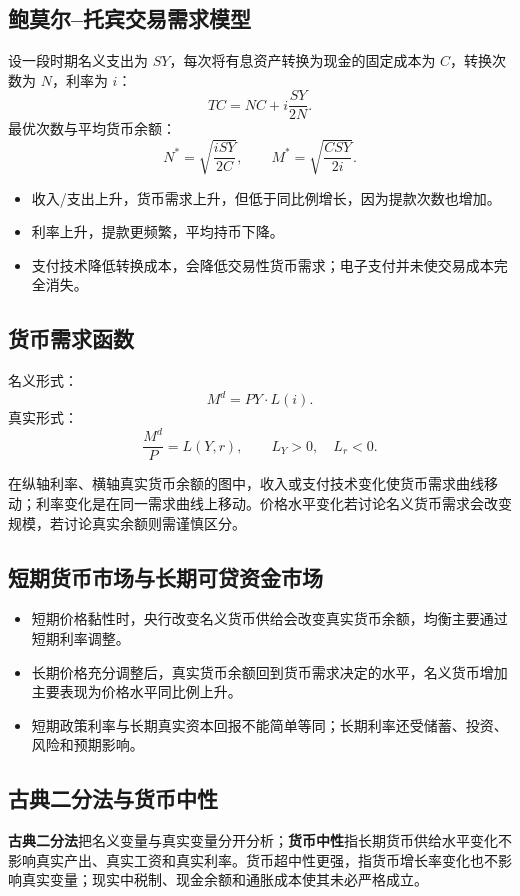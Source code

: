 \documentclass[UTF8,11pt,a4paper]{ctexart}
\newcommand{\term}[1]{\textbf{#1}}
\begin{document}
\subsection{鲍莫尔--托宾交易需求模型}
设一段时期名义支出为 $SY$，每次将有息资产转换为现金的固定成本为 $C$，转换次数为 $N$，利率为 $i$：
\[
TC=NC+i\frac{SY}{2N}.
\]
最优次数与平均货币余额：
\[
N^*=\sqrt{\frac{iSY}{2C}},
\qquad
M^*=\sqrt{\frac{CSY}{2i}}.
\]
\begin{itemize}
  \item 收入/支出上升，货币需求上升，但低于同比例增长，因为提款次数也增加。
  \item 利率上升，提款更频繁，平均持币下降。
  \item 支付技术降低转换成本，会降低交易性货币需求；电子支付并未使交易成本完全消失。
\end{itemize}

\subsection{货币需求函数}
名义形式：
\[
M^d=PY\cdot L(i).
\]
真实形式：
\[
\frac{M^d}{P}=L(Y,r),
\qquad L_Y>0,\quad L_r<0.
\]
\begin{warningbox}[曲线移动与沿曲线移动]
在纵轴利率、横轴真实货币余额的图中，收入或支付技术变化使货币需求曲线移动；利率变化是在同一需求曲线上移动。价格水平变化若讨论名义货币需求会改变规模，若讨论真实余额则需谨慎区分。
\end{warningbox}

\subsection{短期货币市场与长期可贷资金市场}
\begin{itemize}
  \item 短期价格黏性时，央行改变名义货币供给会改变真实货币余额，均衡主要通过短期利率调整。
  \item 长期价格充分调整后，真实货币余额回到货币需求决定的水平，名义货币增加主要表现为价格水平同比例上升。
  \item 短期政策利率与长期真实资本回报不能简单等同；长期利率还受储蓄、投资、风险和预期影响。
\end{itemize}

\subsection{古典二分法与货币中性}
\term{古典二分法}把名义变量与真实变量分开分析；\term{货币中性}指长期货币供给水平变化不影响真实产出、真实工资和真实利率。货币超中性更强，指货币增长率变化也不影响真实变量；现实中税制、现金余额和通胀成本使其未必严格成立。
\end{document}
